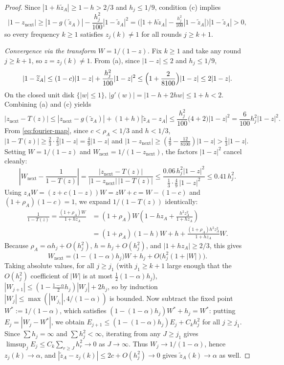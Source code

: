 \documentclass[11pt]{article}
\begin{document}
\begin{proof}
Since $|1+h\widetilde z_A|\ge 1-h>2/3$ and $h_j\le1/9$, condition (c) implies
\[
|1-z_{\mathrm{next}}|\ge |1-g(\widetilde z_A)|-\frac{h_j^2}{100}|1-\widetilde z_A|^2
=\bigl(|1+h\widetilde z_A|-\tfrac{h_j^2}{100}|1-\widetilde z_A|\bigr)|1-\widetilde z_A|>0,
\]
so every frequency $k\ge1$ satisfies $z_j(k)\ne1$ for all rounds $j\ge k+1$.

\emph{Convergence via the transform $W=1/(1-z)$.} Fix $k\ge1$ and take any round $j\ge k+1$, so $z=z_j(k)\ne1$. From (a), since $|1-z|\le2$ and $h_j\le1/9$,
\[
|1-\widetilde z_A|\le(1-c)|1-z|+\frac{h_j^2}{100}|1-z|^2\le\Bigl(1+\frac{2}{8100}\Bigr)|1-z|\le 2|1-z|.
\]
On the closed unit disk $\{|w|\le1\}$, $|g'(w)|=|1-h+2hw|\le 1+h<2$. Combining (a) and (c) yields
\[
|z_{\mathrm{next}}-T(z)|\le |z_{\mathrm{next}}-g(\widetilde z_A)|+(1+h)|\widetilde z_A-z_A|
\le\frac{h_j^2}{100}\bigl(4+2\bigr)|1-z|^2=\frac{6}{100}h_j^2|1-z|^2.
\]
From \eqref{eq:fourier-map}, since $c<\rho_A<1/3$ and $h<1/3$, $|1-T(z)|\ge\frac23\cdot\frac23|1-z|=\frac49|1-z|$ and $|1-z_{\mathrm{next}}|\ge(\frac49-\frac{12}{8100})|1-z|>\frac13|1-z|$. Setting $W=1/(1-z)$ and $W_{\mathrm{next}}=1/(1-z_{\mathrm{next}})$, the factors $|1-z|^2$ cancel cleanly:
\[
\left|W_{\mathrm{next}}-\frac{1}{1-T(z)}\right|
=\frac{|z_{\mathrm{next}}-T(z)|}{|1-z_{\mathrm{next}}|\,|1-T(z)|}
\le\frac{0.06\,h_j^2|1-z|^2}{\frac13\cdot\frac49\,|1-z|^2}\le 0.41\,h_j^2.
\]
Using $z_AW=(z+c(1-z))W=zW+c=W-(1-c)$ and $(1+\rho_A)(1-c)=1$, we expand $1/(1-T(z))$ identically:
\begin{align*}
\frac{1}{1-T(z)}
=\frac{(1+\rho_A)W}{1+hz_A}
&=(1+\rho_A)W\left(1-hz_A+\frac{h^2z_A^2}{1+hz_A}\right)\\
&=(1+\rho_A)(1-h)W+h+\frac{(1+\rho_A)h^2z_A^2}{1+hz_A}W.
\end{align*}
Because $\rho_A=\alpha h_j+O(h_j^2)$, $h=h_j+O(h_j^2)$, and $|1+hz_A|\ge2/3$, this gives
\[
W_{\mathrm{next}}=\bigl(1-(1-\alpha)h_j\bigr)W+h_j+O\bigl(h_j^2(1+|W|)\bigr).
\]
Taking absolute values, for all $j\ge j_1$ (with $j_1\ge k+1$ large enough that the $O(h_j^2)$ coefficient of $|W|$ is at most $\frac12(1-\alpha)h_j$), $|W_{j+1}|\le(1-\frac{1-\alpha}{2}h_j)|W_j|+2h_j$, so by induction $|W_j|\le\max(|W_{j_1}|,4/(1-\alpha))$ is bounded. Now subtract the fixed point $W^*:=1/(1-\alpha)$, which satisfies $(1-(1-\alpha)h_j)W^*+h_j=W^*$: putting $E_j=|W_j-W^*|$, we obtain $E_{j+1}\le(1-(1-\alpha)h_j)E_j+C_k h_j^2$ for all $j\ge j_1$. Since $\sum h_j=\infty$ and $\sum h_j^2<\infty$, iterating from any $J\ge j_1$ gives $\limsup_j E_j\le C_k\sum_{r\ge J}h_r^2\to0$ as $J\to\infty$. Thus $W_j\to 1/(1-\alpha)$, hence $z_j(k)\to\alpha$, and $|\widetilde z_A-z_j(k)|\le 2c+O(h_j^2)\to0$ gives $\widetilde z_A(k)\to\alpha$ as well.


\end{proof}
\end{document}
